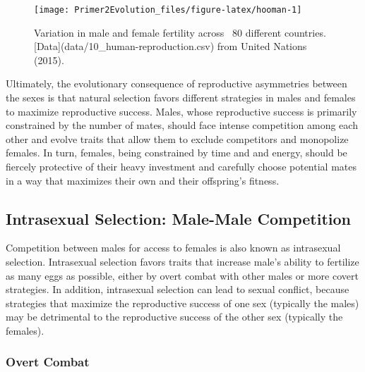 \documentclass[
]{book}
\begin{document}
\begin{figure}
\texttt{[image: Primer2Evolution\_files/figure-latex/hooman-1]} \caption{Variation in male and female fertility across ~80 different countries. [Data](data/10_human-reproduction.csv) from United Nations (2015).}\label{fig:hooman}
\end{figure}

Ultimately, the evolutionary consequence of reproductive asymmetries between the sexes is that natural selection favors different strategies in males and females to maximize reproductive success. Males, whose reproductive success is primarily constrained by the number of mates, should face intense competition among each other and evolve traits that allow them to exclude competitors and monopolize females. In turn, females, being constrained by time and and energy, should be fiercely protective of their heavy investment and carefully choose potential mates in a way that maximizes their own and their offspring's fitness.

\hypertarget{intrasexual-selection-male-male-competition}{%
\subsection{Intrasexual Selection: Male-Male Competition}\label{intrasexual-selection-male-male-competition}}

Competition between males for access to females is also known as intrasexual selection. Intrasexual selection favors traits that increase male's ability to fertilize as many eggs as possible, either by overt combat with other males or more covert strategies. In addition, intrasexual selection can lead to sexual conflict, because strategies that maximize the reproductive success of one sex (typically the males) may be detrimental to the reproductive success of the other sex (typically the females).

\hypertarget{overt-combat}{%
\subsubsection*{Overt Combat}\label{overt-combat}}
\end{document}
